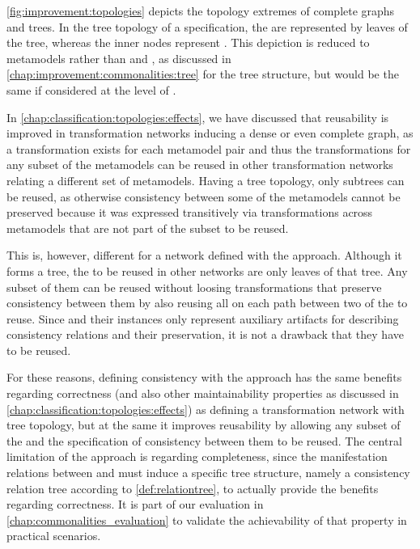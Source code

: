 \autoref{fig:improvement:topologies} depicts the topology extremes of complete graphs and trees.
In the tree topology of a \commonalities specification, the \concretemetamodels are represented by leaves of the tree, whereas the inner nodes represent \conceptmetamodels.
This depiction is reduced to metamodels rather than \metaclasses and \commonalities, as discussed in \autoref{chap:improvement:commonalities:tree} for the tree structure, but would be the same if considered at the level of \metaclasses.

In \autoref{chap:classification:topologies:effects}, we have discussed that reusability is improved in transformation networks inducing a dense or even complete graph, as a transformation exists for each metamodel pair and thus the transformations for any subset of the metamodels can be reused in other transformation networks relating a different set of metamodels.
Having a tree topology, only subtrees can be reused, as otherwise consistency between some of the metamodels cannot be preserved because it was expressed transitively via transformations across metamodels that are not part of the subset to be reused.

This is, however, different for a network defined with the \commonalities approach.
Although it forms a tree, the \concretemetamodels to be reused in other networks are only leaves of that tree.
Any subset of them can be reused without loosing transformations that preserve consistency between them by also reusing all \conceptmetamodels on each path between two of the \concretemetamodels to reuse.
Since \conceptmetamodels and their instances only represent auxiliary artifacts for describing consistency relations and their preservation, it is not a drawback that they have to be reused.

For these reasons, defining consistency with the \commonalities approach has the same benefits regarding correctness (and also other maintainability properties as discussed in \autoref{chap:classification:topologies:effects}) as defining a transformation network with tree topology, but at the same it improves reusability by allowing any subset of the \concretemetamodels and the specification of consistency between them to be reused.
The central limitation of the approach is regarding completeness, since the manifestation relations between \metaclasses and \commonalities must induce a specific tree structure, namely a consistency relation tree according to \autoref{def:relationtree}, to actually provide the benefits regarding correctness.
It is part of our evaluation in \autoref{chap:commonalities_evaluation} to validate the achievability of that property in practical scenarios.

